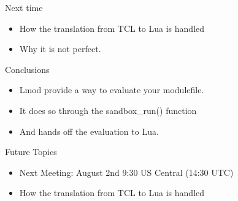 \documentclass{beamer}
\begin{document}
\begin{frame}{Next time}
  \begin{itemize}
    \item How the translation from TCL to Lua is handled
    \item Why it is not perfect.
  \end{itemize}
\end{frame}

\begin{frame}{Conclusions}
  \begin{itemize}
    \item Lmod provide a way to evaluate your modulefile.
    \item It does so through the sandbox\_run() function
    \item And hands off the evaluation to Lua.
  \end{itemize}
\end{frame}

\begin{frame}{Future Topics}
  \begin{itemize}
    \item Next Meeting: August 2nd 9:30 US Central (14:30 UTC)
    \item How the translation from TCL to Lua is handled
  \end{itemize}
\end{frame}
\end{document}
